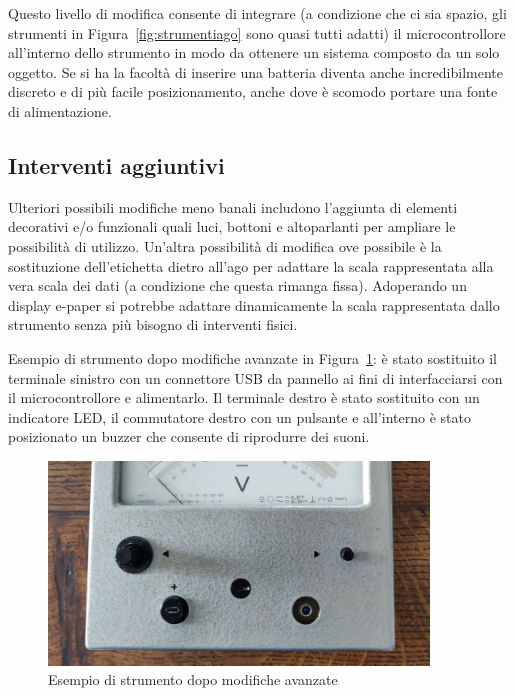 \documentclass[12pt,a4paper]{report}
\begin{document}
Questo livello di modifica consente di integrare (a condizione che ci sia spazio, gli strumenti in Figura~\ref{fig:strumentiago} sono
quasi tutti adatti) il microcontrollore all'interno dello strumento in modo da ottenere un sistema composto da un solo oggetto.
Se si ha la facoltà di inserire una batteria diventa anche incredibilmente discreto e di più facile posizionamento, anche dove è
scomodo portare una fonte di alimentazione.


\subsection{Interventi aggiuntivi}
Ulteriori possibili modifiche meno banali includono l'aggiunta di elementi decorativi e/o funzionali quali luci, bottoni e altoparlanti
per ampliare le possibilità di utilizzo. Un'altra possibilità di modifica ove possibile è la sostituzione dell'etichetta dietro all'ago per adattare
la scala rappresentata alla vera scala dei dati (a condizione che questa rimanga fissa). Adoperando un display e-paper si potrebbe
adattare dinamicamente la scala rappresentata dallo strumento senza più bisogno di interventi fisici.

Esempio di strumento dopo modifiche avanzate in Figura~\ref{fig:interventocompleto}:
è stato sostituito il terminale sinistro con un connettore USB da pannello ai fini di interfacciarsi con il microcontrollore e alimentarlo.
Il terminale destro è stato sostituito con un indicatore LED, il commutatore
destro con un pulsante e all'interno è stato posizionato un buzzer che consente di riprodurre dei suoni.




\begin{figure}[h]
  \centering
  \includegraphics[width=0.9\textwidth]{interventocompleto}
  \caption{Esempio di strumento dopo modifiche avanzate}
  \label{fig:interventocompleto}
\end{figure}
\end{document}

